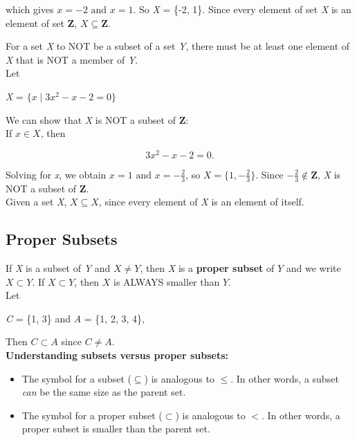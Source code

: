 which gives $x = -2 \text{ and } x = 1$. So \textit{X} = \{-2, 1\}.  Since every element of set \textit{X} is an element of set \textbf{Z}, $X \subseteq \textbf{Z}$.

\clearpage

For a set \textit{X} to NOT be a subset of a set \textit{Y}, there must be at least one element of \textit{X} that is NOT a member of \textit{Y}.\\

Let

\begin{center}
\textit{X} = $\{x \mid 3x^2 - x - 2 = 0 \}$
\end{center}

We can show that \textit{X} is NOT a subset of \textbf{Z}:\\

If $x \in X$, then

\[
    3x^2 - x - 2 = 0.
\]

Solving for \textit{x}, we obtain $x = 1 \text{ and } x = -\frac{2}{3}$, so $X = \{1, -\frac{2}{3}\}$.  Since $-\frac{2}{3} \not\in \textbf{Z}$, \textit{X} is NOT a subset of \textbf{Z}.\\

Given a set \textit{X}, $X \subseteq X$, since every element of \textit{X} is an element of itself.\\

\subsection*{Proper Subsets}

If \textit{X} is a subset of \textit{Y} and $X \neq Y$, then \textit{X} is a \textbf{proper subset} of $Y$ and we write $X \subset Y$.  If $X \subset Y$, then $X$ is ALWAYS smaller than $Y$.\\

Let

\begin{center}
\textit{C} = \{1, 3\} and \textit{A} = \{1, 2, 3, 4\},
\end{center}

Then $C \subset A$ since $C \neq A$.\\


\textbf{Understanding subsets versus proper subsets:}

\begin{itemize}
\item The symbol for a subset ($\subseteq$) is analogous to $\leq$.  In other words, a subset \textit{can} be the same size as the parent set.
\item The symbol for a proper subset ($\subset$) is analogous to $<$.  In other words, a proper subset is smaller than the parent set.
\end{itemize}

